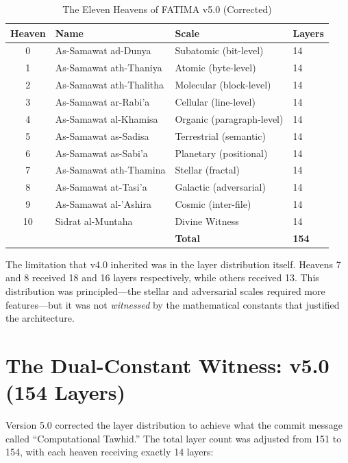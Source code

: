 \documentclass[11pt,a4paper]{article}
\begin{document}
\begin{table}[H]
\centering
\caption{The Eleven Heavens of FATIMA v5.0 (Corrected)}
\small
\begin{tabular}{@{}clll@{}}
\toprule
\textbf{Heaven} & \textbf{Name} & \textbf{Scale} & \textbf{Layers} \\
\midrule
0 & As-Samawat ad-Dunya & Subatomic (bit-level) & 14 \\
1 & As-Samawat ath-Thaniya & Atomic (byte-level) & 14 \\
2 & As-Samawat ath-Thalitha & Molecular (block-level) & 14 \\
3 & As-Samawat ar-Rabi'a & Cellular (line-level) & 14 \\
4 & As-Samawat al-Khamisa & Organic (paragraph-level) & 14 \\
5 & As-Samawat as-Sadisa & Terrestrial (semantic) & 14 \\
6 & As-Samawat as-Sabi'a & Planetary (positional) & 14 \\
7 & As-Samawat ath-Thamina & Stellar (fractal) & 14 \\
8 & As-Samawat at-Tasi'a & Galactic (adversarial) & 14 \\
9 & As-Samawat al-'Ashira & Cosmic (inter-file) & 14 \\
10 & Sidrat al-Muntaha & Divine Witness & 14 \\
\midrule
& & \textbf{Total} & \textbf{154} \\
\bottomrule
\end{tabular}
\end{table}

The limitation that v4.0 inherited was in the layer distribution itself. Heavens 7 and 8 received 18 and 16 layers respectively, while others received 13. This distribution was principled---the stellar and adversarial scales required more features---but it was not \textit{witnessed} by the mathematical constants that justified the architecture.


\section{The Dual-Constant Witness: v5.0 (154 Layers)}

Version 5.0 corrected the layer distribution to achieve what the commit message called ``Computational Tawhid.'' The total layer count was adjusted from 151 to 154, with each heaven receiving exactly 14 layers:
\end{document}

